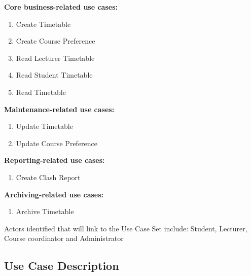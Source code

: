 \documentclass{article}
\begin{document}
\textbf{Core business-related use cases:}
\begin{enumerate}[nosep]
\item Create Timetable
\item Create Course Preference
\item Read Lecturer Timetable
\item Read Student Timetable 
\item Read Timetable
\end{enumerate}

\textbf{Maintenance-related use cases:}
\begin{enumerate}
\item Update Timetable
\item Update Course Preference
\end{enumerate}

\textbf{Reporting-related use cases:}
\begin{enumerate}
\item Create Clash Report
\end{enumerate}

\textbf{Archiving-related use cases:}
\begin{enumerate}
\item Archive Timetable
\end{enumerate}

Actors identified that will link to the Use Case Set include: Student, Lecturer, Course coordinator and Administrator


\subsection{Use Case Description}
\end{document}
